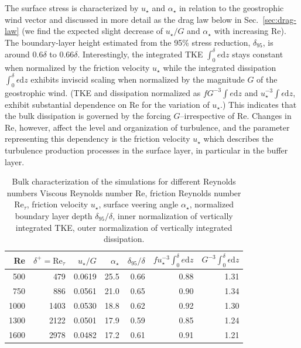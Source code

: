 \documentclass[smallcondensed,final]{svjour3}
\newcommand{\RE}{\mathrm{Re}}
\begin{document}
%
The surface stress is characterized by $u_\star$ and $\alpha_\star$ in relation to the geostrophic wind vector
and discussed in more detail as the drag law below in Sec.~\ref{sec:drag-law}
(we find the expected slight decrease of $u_\star/G$ and $\alpha_\star$ with increasing $\RE$).
%
The boundary-layer height estimated from the 95\% stress reduction, $\delta_{95}$, is around $0.6\delta$ to $0.66\delta$. 
%
Interestingly, the integrated TKE $\int_{0}^{\delta} e\mathrm{d}z$ stays constant when normalized by the friction velocity $u_\star$
while the integrated dissipation $\int_{0}^{\delta} \epsilon\mathrm{d}z$ exhibits inviscid scaling when normalized
by the magnitude $G$ of the geostrophic wind. 
%
(TKE and dissipation normalized as
$f G^{-3} \int e \mathrm{d} z$ and $u_\star^{-3} \int \epsilon\mathrm{d}z$, exhibit substantial
dependence on $\RE$ for the variation of $u_\star$.)
%
This indicates that the bulk dissipation is governed by the forcing $G$--irrespective of $\RE$. 
%
Changes in $\RE$, however, affect the level and organization of turbulence, and the parameter
representing this dependency is the friction velocity $u_\star$ which describes the turbulence
production processes in the surface layer, in particular in the buffer layer. 
% 
\begin{table}
  \caption{Bulk characterization of the simulations for different Reynolds numbers 
    Viscous Reynolds number $\RE$,
    friction Reynolds number  $\RE_\tau$,
    friction velocity $u_\star$,
    surface veering angle $\alpha_\star$,
    normalized boundary layer depth $\delta_{95}/\delta$, 
    inner normalization of vertically integrated TKE, 
    outer normalization of vertically integrated dissipation.
    \label{tab:bulk_results}}
  \centering\begin{tabular}{r r r r r r r }
      \toprule
      Re & $\delta^+=\RE_\tau$& $u_\star/G$ & $\alpha_\star$ & $\delta_{95}/\delta$ & $f u_\star^{-3}\int_{0}^{\delta} e \mathrm{d} z $ & $ G^{-3}\int_{0}^{\delta} \epsilon \mathrm{d}z$\\
      \midrule 
      \rowcolor{gray!30} 
      500 & 479 & 0.0619& 25.5 & 0.66& 0.88& 1.31 \\
      \rowcolor{gray!30} 
      750 & 886 & 0.0561& 21.0 & 0.65& 0.90& 1.34 \\
      \rowcolor{gray!30}
      1000& 1403& 0.0530& 18.8 & 0.62& 0.92& 1.30 \\
      \midrule
      1300& 2122& 0.0501& 17.9 & 0.59& 0.85& 1.24 \\
      1600& 2978& 0.0482& 17.2 & 0.61& 0.91& 1.21 \\ 
      \bottomrule
  \end{tabular}
\end{table} 
\end{document}
